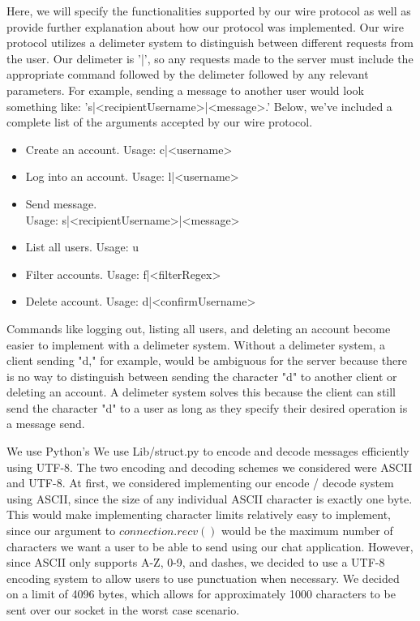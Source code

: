 \documentclass[
	a4paper, %
	10pt, %
	unnumberedsections, %
	twoside, %
]{LTJournalArticle}
\begin{document}
Here, we will specify the functionalities supported by our wire protocol as well as provide further explanation about how our protocol was implemented. Our wire protocol utilizes a delimeter system to distinguish between different requests from the user. Our delimeter is '|', so any requests made to the server must include the appropriate command followed by the delimeter followed by any relevant parameters. For example, sending a message to another user would look something like: 's|<recipientUsername>|<message>.' Below, we've included a complete list of the arguments accepted by our wire protocol. 
\begin{itemize}
    \item Create an account. Usage: c|<username>
    \item Log into an account. Usage: l|<username>
    \item Send message. \\
    Usage: s|<recipientUsername>|<message>
    \item List all users. Usage: u
    \item Filter accounts. Usage: f|<filterRegex>
    \item Delete account. Usage: d|<confirmUsername>
\end{itemize}

Commands like logging out, listing all users, and deleting an account become easier to implement with a delimeter system. Without a delimeter system, a client sending "d," for example, would be ambiguous for the server because there is no way to distinguish between sending the character "d" to another client or deleting an account. A delimeter system solves this because the client can still send the character "d" to a user as long as they specify their desired operation is a message send. 

We use Python's We use Lib/struct.py to encode and decode messages efficiently using UTF-8. The two encoding and decoding schemes we considered were ASCII and UTF-8. At first, we considered implementing our encode / decode system using ASCII, since the size of any individual ASCII character is exactly one byte. This would make implementing character limits relatively easy to implement, since our argument to $connection.recv()$ would be the maximum number of characters we want a user to be able to send using our chat application. However, since ASCII only supports A-Z, 0-9, and dashes, we decided to use a UTF-8 encoding system to allow users to use punctuation when necessary. We decided on a limit of 4096 bytes, which allows for approximately 1000 characters to be sent over our socket in the worst case scenario. 
\end{document}
